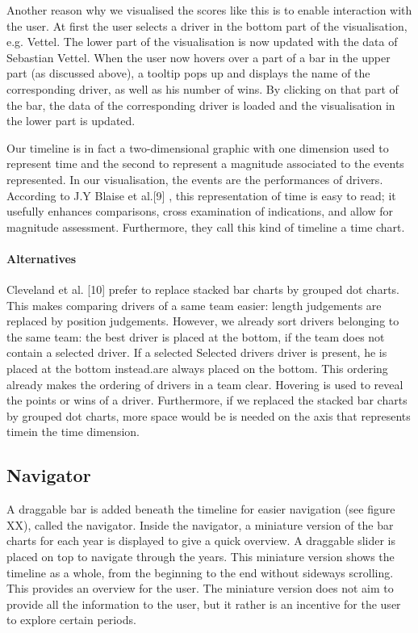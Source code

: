 \documentclass{sigchi}
\begin{document}
Another reason why we visualised the scores like this is to enable interaction with the user. At first the user selects a driver in the bottom part of the visualisation, e.g. Vettel. The lower part of the visualisation is now updated with the data of Sebastian Vettel. When the user now hovers over a part of a bar in the upper part (as discussed above), a tooltip pops up and displays the name of the corresponding driver, as well as his number of wins.  By clicking on that part of the bar, the data of the corresponding driver is loaded and the visualisation in the lower part is updated. 

Our timeline is in fact a two-dimensional graphic with one dimension used to represent time and the second to represent a magnitude associated to the events represented. In our visualisation, the events are the performances of drivers. According to J.Y Blaise et al.[9] , this representation of time is easy to read; it usefully enhances comparisons, cross examination of indications, and allow for magnitude assessment.  Furthermore, they call this kind of timeline a time chart. 

\paragraph{Alternatives} %
\label{par:alternatives}
Cleveland et al.  [10] prefer to replace stacked bar charts by grouped dot charts. This makes comparing drivers of a same team easier: length judgements are replaced by position judgements. However, we already sort drivers belonging to the same team: the best driver is placed at the bottom, if the team does not contain a selected driver. If a selected Selected drivers driver is present, he is placed at the bottom instead.are always placed on the bottom. This ordering already makes the ordering of drivers in a team clear. Hovering is used to reveal the points or wins of a driver. Furthermore, if we replaced the stacked bar charts by grouped dot charts, more space would be is needed on the axis that represents timein the time dimension. 



\subsection{Navigator}

A draggable bar is added beneath the timeline for easier navigation (see figure XX), called the navigator. Inside the navigator, a miniature version of the bar charts for each year is displayed to give a quick overview. A draggable slider is placed on top to navigate through the years.
This miniature version shows the timeline as a whole, from the beginning to the end without sideways scrolling. This provides an overview for the user. The miniature version does not aim to provide all the information to the user, but it rather is an incentive for the user to explore certain periods. 
\end{document}
